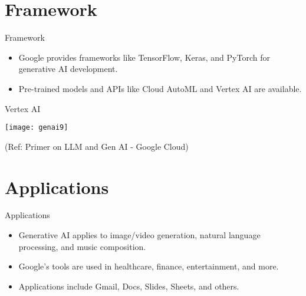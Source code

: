 \section{Framework}

\begin{frame}[fragile]{Framework}
\begin{itemize}
\item Google provides frameworks like TensorFlow, Keras, and PyTorch for generative AI development.
\item Pre-trained models and APIs like Cloud AutoML and Vertex AI are available.
\end{itemize}
\end{frame}

\begin{frame}[fragile]{Vertex AI}

\begin{center}
\texttt{[image: genai9]}
\end{center}

{\tiny (Ref: Primer on LLM and Gen AI - Google Cloud)}
  
\end{frame}


\section{Applications}

\begin{frame}[fragile]{Applications}
\begin{itemize}
\item Generative AI applies to image/video generation, natural language processing, and music composition.
\item Google's tools are used in healthcare, finance, entertainment, and more.
\item Applications include Gmail, Docs, Slides, Sheets, and others.
\end{itemize}
\end{frame}

